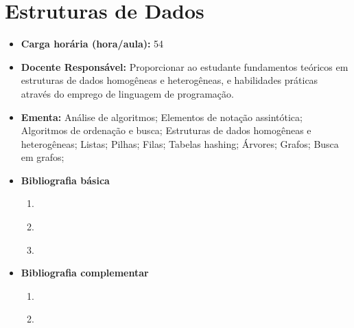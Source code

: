 \documentclass[11pt,fleqn]{book} %
\begin{document}
\section{Estruturas de Dados}\label{2_estruturadedados}
\begin{itemize}
	\item \textbf{Carga horária (hora/aula):} 54
	\item \textbf{Docente Responsável:} Proporcionar ao estudante fundamentos teóricos em estruturas de dados homogêneas e heterogêneas, e habilidades práticas através do emprego de linguagem de programação.
	\item \textbf{Ementa:} 
	Análise de algoritmos; 
	Elementos de notação assintótica;
	Algoritmos de ordenação e busca;
	Estruturas de dados homogêneas e heterogêneas;
	Listas;
	Pilhas;
	Filas;
	Tabelas hashing;
	Árvores;
	Grafos;
	Busca em grafos;	
	\item \textbf{Bibliografia básica}
	\begin{enumerate}
		\item \cite{ascencio2010estruturas}
		\item \cite{cormen2002algoritmos}
		\item \cite{silva2007estrutura}
	\end{enumerate}
	\item \textbf{Bibliografia complementar}
	\begin{enumerate}
		\item \cite{szwarcfiter1994estruturas}	
		\item \cite{lafore2004estruturas}	
	\end{enumerate}	
\end{itemize}

\newpage
\end{document}
